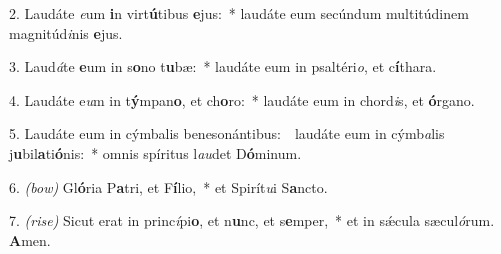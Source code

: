 2. Laudáte \textit{e}um \textbf{i}n virt\textbf{ú}tibus \textbf{e}jus:~* laudáte eum secúndum multitúdinem magnitúd\textit{i}nis \textbf{e}jus.

3. Laud\textit{á}te \textbf{e}um in s\textbf{o}no t\textbf{u}bæ:~* laudáte eum in psaltéri\textit{o}, et c\textbf{í}thara.
	
4. Laudáte e\textit{u}m in t\textbf{ý}mpan\textbf{o}, et ch\textbf{o}ro:~* laudáte eum in chord\textit{i}s, et \textbf{ó}rgano.
	
5. Laudáte eum in cýmbalis benesonántibus:~{\color{red}\GreDagger}\ laudáte eum in cýmb\textit{a}lis j\textbf{u}bil\textbf{a}ti\textbf{ó}nis:~* omnis spíritus l\textit{au}det D\textbf{ó}minum.
	
6. {\color{red}\textit{(bow)}} Gl\textbf{ó}ria P\textbf{a}tri, et F\textbf{í}lio,~* et Spirít\textit{u}i S\textbf{a}ncto.
	
7. {\color{red}\textit{(rise)}} Sicut erat in princ\textit{í}pi\textbf{o}, et n\textbf{u}nc, et s\textbf{e}mper,~* et in s\'{\ae}cula sæcul\textit{ó}rum. \textbf{A}men.
